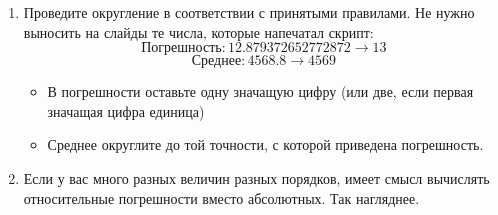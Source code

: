 \documentclass{article}
\begin{document}
\begin {enumerate}
\item Проведите округление в соответствии с принятыми правилами. Не нужно выносить на слайды те числа, которые напечатал скрипт:
$$ \text{Погрешность}: 12.879372652772872 \rightarrow 13 $$
$$ \text{Среднее}: 4568.8 \rightarrow 4569 $$
\begin{itemize}
\item В погрешности оставьте одну значащую цифру (или две, если первая значащая цифра единица)
\item Среднее округлите до той точности, с которой приведена погрешность.
\end{itemize}

\item Если у вас много разных величин разных порядков, имеет смысл вычислять относительные погрешности вместо абсолютных. Так нагляднее.
\end{enumerate}
\end{document}
